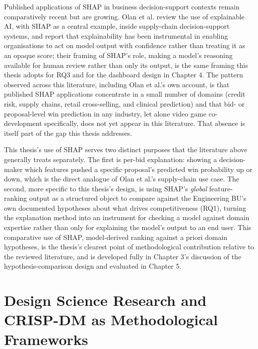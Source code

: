 Published applications of SHAP in business decision-support contexts
remain comparatively recent but are growing. Olan et al.
\citep{olan2024enabling} review the use of explainable AI, with SHAP as
a central example, inside supply-chain decision-support systems, and
report that explainability has been instrumental in enabling
organisations to act on model output with confidence rather than
treating it as an opaque score; their framing of SHAP's role, making a
model's reasoning available for human review rather than only its
output, is the same framing this thesis adopts for RQ3 and for the
dashboard design in Chapter 4. The pattern observed across this
literature, including Olan et al.'s own account, is that published SHAP
applications concentrate in a small number of domains (credit risk,
supply chains, retail cross-selling, and clinical prediction) and that
bid- or proposal-level win prediction in any industry, let alone video
game co-development specifically, does not yet appear in this
literature. That absence is itself part of the gap this thesis
addresses.

This thesis's use of SHAP serves two distinct purposes that the
literature above generally treats separately. The first is per-bid
explanation: showing a decision-maker which features pushed a specific
proposal's predicted win probability up or down, which is the direct
analogue of Olan et al.'s supply-chain use case. The second, more
specific to this thesis's design, is using SHAP's \emph{global}
feature-ranking output as a structured object to compare against the
Engineering BU's own documented hypotheses about what drives
competitiveness (RQ1), turning the explanation method into an instrument
for checking a model against domain expertise rather than only for
explaining the model's output to an end user. This comparative use of
SHAP, model-derived ranking against a priori domain hypotheses, is the
thesis's clearest point of methodological contribution relative to the
reviewed literature, and is developed fully in Chapter 3's discussion of
the hypothesis-comparison design and evaluated in Chapter 5.

\hypertarget{design-science-research-and-crisp-dm-as-methodological-frameworks}{%
\section{Design Science Research and CRISP-DM as Methodological
Frameworks}\label{design-science-research-and-crisp-dm-as-methodological-frameworks}}

